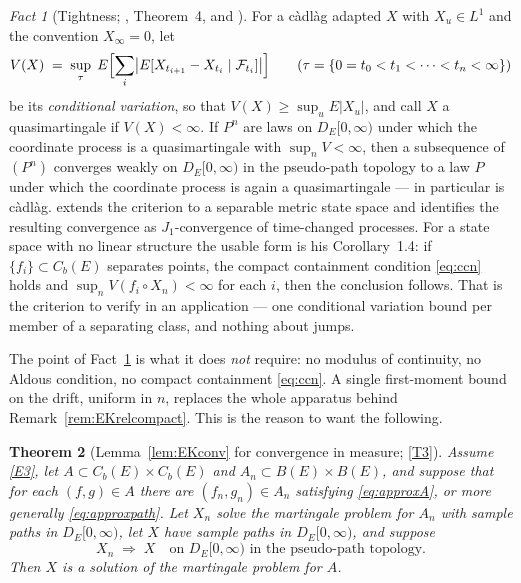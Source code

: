 \documentclass[11pt,a4paper]{article}
\theoremstyle{plain}
\newtheorem{theorem}{Theorem}[section]
\theoremstyle{definition}
\theoremstyle{remark}
\newtheorem{fact}[theorem]{Fact}
\newcommand{\Bdd}{B}                           %
\newcommand{\Cb}{C_b}                          %
\newcommand{\DE}{D_E[0,\infty)}
\newcommand{\Filt}{\mathcal{F}}
\DeclareMathOperator*{\wto}{\Rightarrow}
\newcommand{\MZ}{\cite{MZ84}}
\newcommand{\Ku}{\cite{Kurtz91}}
\begin{document}
\begin{fact}[Tightness; \MZ, Theorem~4, and \Ku]
  \label{fact:MZtight}
  For a c\`adl\`ag adapted $X$ with $X_u \in L^1$ and the convention
  $X_\infty = 0$, let
  \[
    V(X) \;=\; \sup_\tau\; E\Bigl[ \sum_i \bigl| E[ X_{t_{i+1}} - X_{t_i} \mid \Filt_{t_i} ] \bigr| \Bigr]
    \qquad (\tau = \{ 0 = t_0 < t_1 < \dots < t_n < \infty \})
  \]
  be its \emph{conditional variation}, so that $V(X) \geq \sup_u E|X_u|$, and call
  $X$ a quasimartingale if $V(X) < \infty$.  If $P^n$ are laws on $\DE$ under
  which the coordinate process is a quasimartingale with $\sup_n V < \infty$, then
  a subsequence of $(P^n)$ converges weakly on $\DE$ in the pseudo-path topology
  to a law $P$ under which the coordinate process is again a quasimartingale ---
  in particular is c\`adl\`ag.  \Ku{} extends the criterion to a separable metric
  state space and identifies the resulting convergence as $J_1$-convergence of
  time-changed processes.  For a state space with no linear structure the usable
  form is his Corollary~1.4: if $\{f_i\} \subset \Cb(E)$ separates points, the
  compact containment condition \eqref{eq:ccn} holds and
  $\sup_n V(f_i \circ X_n) < \infty$ for each $i$, then the conclusion follows.
  That is the criterion to verify in an application --- one conditional variation
  bound per member of a separating class, and nothing about jumps.
\end{fact}

The point of Fact~\ref{fact:MZtight} is what it does \emph{not} require: no
modulus of continuity, no Aldous condition, no compact containment
\eqref{eq:ccn}.  A single first-moment bound on the drift, uniform in $n$,
replaces the whole apparatus behind Remark~\ref{rem:EKrelcompact}.  This is the
reason to want the following.

\begin{theorem}[Lemma~\ref{lem:EKconv} for convergence in measure; \eqref{T3}]
  \label{thm:MZconv}
  Assume \eqref{E3}, let $A \subset \Cb(E) \times \Cb(E)$ and
  $A_n \subset \Bdd(E) \times \Bdd(E)$, and suppose that for each $(f,g) \in A$
  there are $(f_n,g_n) \in A_n$ satisfying \eqref{eq:approxA}, or more generally
  \eqref{eq:approxpath}.  Let $X_n$ solve the martingale problem for $A_n$ with
  sample paths in $\DE$, let $X$ have sample paths in $\DE$, and suppose
  \[
    X_n \;\wto\; X \quad\text{on } \DE \text{ in the pseudo-path topology.}
  \]
  Then $X$ is a solution of the martingale problem for $A$.
\end{theorem}
\end{document}
